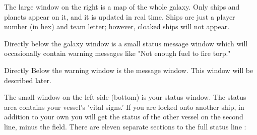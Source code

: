 The large window on the right is a map of the whole galaxy.
Only ships and planets appear on it, and it is updated in real time.
Ships are just a player number (in hex) and team letter; however, cloaked
ships will not appear.

Directly below the galaxy window is a small status message window which will
occasionally contain warning messages like "Not enough fuel to fire
torp." 

Directly Below the warning window is the message window.  This window
will be described later.

The small window on the left side (bottom) is your status window.  
The status area contains your vessel's 'vital signs.'
If you are locked onto another ship, in addition to your own you
will get the status of the other vessel on the second line, minus
the  field. There are eleven separate sections to the
full status line :

